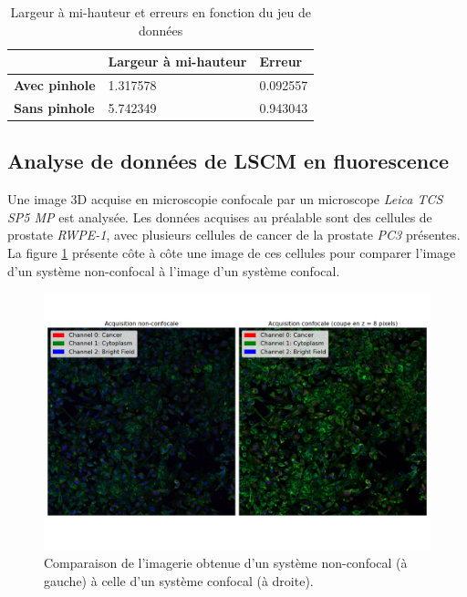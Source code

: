 \documentclass[11pt,letterpaper]{article}
\begin{document}
\begin{table}[H]
\centering
\begin{tabular}{|p{3.2cm}|p{4.2cm}|p{3.2cm}|}
\cline{2-3}
\multicolumn{1}{c|}{} & \textbf{Largeur à mi-hauteur} & \textbf{Erreur} \\
\hline
\textbf{Avec pinhole} & 1.317578 & 0.092557 \\
\hline
\textbf{Sans pinhole} & 5.742349 & 0.943043 \\
\hline
\end{tabular}
\caption{Largeur à mi-hauteur et erreurs en fonction du jeu de données}
\label{FMWH}
\end{table}

\subsection{Analyse de données de LSCM en fluorescence}

Une image 3D acquise en microscopie confocale par un microscope \textit{Leica TCS SP5 MP} est analysée. Les données
acquises au préalable sont des cellules de prostate \textit{RWPE-1}, avec plusieurs cellules de cancer de la prostate
\textit{PC3} présentes. La figure \ref{non_yes_confo} présente côte à côte une image de ces cellules pour comparer
l'image d'un système non-confocal à l'image d'un système confocal.

\begin{figure}[H]
  \centering
  \includegraphics[scale=0.45]{non_and_yes_confocal.png}
  \caption{Comparaison de l'imagerie obtenue d'un système non-confocal (à gauche) à celle d'un système confocal (à droite).}
  \label{non_yes_confo}
\end{figure}
\end{document}
